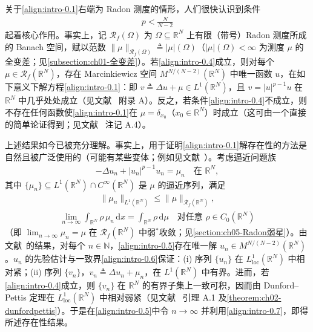 \documentclass[../main.tex]{subfiles}
\begin{document}
关于\eqref{align:intro-0.1}右端为 Radon 测度的情形，人们很快认识到条件
\begin{align}
p < \frac{N}{N-2} \label{align:intro-0.4}
\end{align}
起着核心作用。事实上，记 $\mathscr{R}_f(\Omega)$ 为 $\Omega\subseteq\mathbb{R}^N$ 上有限（带号）Radon 测度所成的 Banach 空间，赋以范数 $\|\mu\|_{\mathscr{R}_f(\Omega)}\triangleq |\mu|(\Omega)$（$|\mu|(\Omega)<\infty$ 为测度 $\mu$ 的全变差；见\cref{subsection:ch01-全变差}）。若\eqref{align:intro-0.4}成立，则对每个 $\mu\in\mathscr{R}_f(\mathbb{R}^N)$，存在 Marcinkiewicz 空间 $M^{N/(N-2)}(\mathbb{R}^N)$ 中唯一函数 $u$，在如下意义下解方程\eqref{align:intro-0.1}：即 $v\triangleq \Delta u+\mu\in L^1(\mathbb{R}^N)$，且 $v=|u|^{p-1}u$ 在 $\mathbb{R}^N$ 中几乎处处成立（见文献~\cite{ref14} 附录 A）。反之，若条件\eqref{align:intro-0.4}不成立，则不存在任何函数使\eqref{align:intro-0.1}在 $\mu=\delta_{x_0}$（$x_0\in\mathbb{R}^N$）时成立（这可由一个直接的简单论证得到；见文献~\cite{ref14} 注记 A.4）。

上述结果如今已被充分理解。事实上，用于证明\eqref{align:intro-0.1}解存在性的方法是自然且被广泛使用的（可能有某些变体；例如见文献~\cite{ref27}）。考虑逼近问题族
\begin{align}
-\Delta u_n + |u_n|^{p-1}u_n = \mu_n \quad \text{在 }\mathbb{R}^N, \label{align:intro-0.5}
\end{align}
其中 $\{\mu_n\}\subseteq L^1(\mathbb{R}^N)\cap C^\infty(\mathbb{R}^N)$ 是 $\mu$ 的逼近序列，满足
\begin{align}
\|\mu_n\|_{L^1(\mathbb{R}^N)} \leqslant \|\mu\|_{\mathscr{R}_f(\mathbb{R}^N)}, \label{align:intro-0.6}
\end{align}
\begin{align}
\lim_{n\to\infty}\int_{\mathbb{R}^N}\rho\,\mu_n\,\mathrm{d}x
= \int_{\mathbb{R}^N}\rho\,\mathrm{d}\mu
\quad \text{对任意 }\rho\in C_0(\mathbb{R}^N) \label{align:intro-0.7}
\end{align}
（即 $\lim_{n\to\infty}\mu_n=\mu$ 在 $\mathscr{R}_f(\mathbb{R}^N)$ 中弱$^*$收敛；见\cref{section:ch05-Radon弱星}）。由文献~\cite{ref15}的结果，对每个 $n\in\mathbb{N}$，\eqref{align:intro-0.5}存在唯一解 $u_n\in M^{N/(N-2)}(\mathbb{R}^N)$。$u_n$ 的先验估计与一致界\eqref{align:intro-0.6}保证：(i) 序列 $\{u_n\}$ 在 $L^1_{\mathrm{loc}}(\mathbb{R}^N)$ 中相对紧；(ii) 序列 $\{v_n\}$，$v_n\triangleq \Delta u_n+\mu_n$，在 $L^1(\mathbb{R}^N)$ 中有界。进而，若\eqref{align:intro-0.4}成立，则 $\{v_n\}$ 在 $\mathbb{R}^N$ 的有界子集上一致可积，因而由 Dunford--Pettis 定理在 $L^1_{\mathrm{loc}}(\mathbb{R}^N)$ 中相对弱紧（见文献~\cite{ref14} 引理 A.1 及\cref{theorem:ch02-dunfordpettis}）。于是在\eqref{align:intro-0.5}中令 $n\to\infty$ 并利用\eqref{align:intro-0.7}，即得所述存在性结果。
\end{document}
